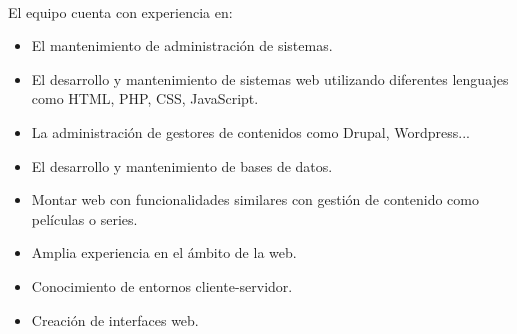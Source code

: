 
\paragraph{} El equipo cuenta con experiencia en:
\begin{itemize}

\item El mantenimiento de administración de sistemas.
\item El desarrollo y mantenimiento de sistemas web utilizando diferentes lenguajes como HTML, PHP, CSS, JavaScript.
\item La administración de gestores de contenidos como Drupal, Wordpress... 
\item El desarrollo y mantenimiento de bases de datos.
\item Montar web con funcionalidades similares con gestión de contenido como películas o series.

\end{itemize}

\begin{itemize}

\item Amplia experiencia en el ámbito de la web.
\item Conocimiento de entornos cliente-servidor.
\item Creación de interfaces web.

\end{itemize}